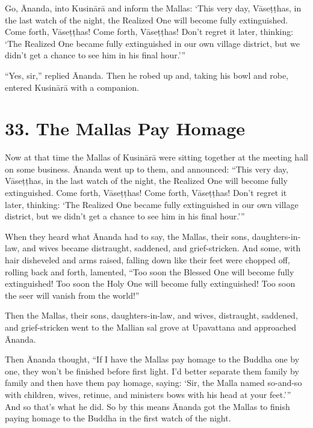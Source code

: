 \documentclass[12pt,openany]{book}%
\begin{document}
Go, Ānanda, into \textsanskrit{Kusinārā} and inform the Mallas: ‘This very day, \textsanskrit{Vāseṭṭhas}, in the last watch of the night, the Realized One will become fully extinguished. Come forth, \textsanskrit{Vāseṭṭhas}! Come forth, \textsanskrit{Vāseṭṭhas}! Don’t regret it later, thinking: ‘The Realized One became fully extinguished in our own village district, but we didn’t get a chance to see him in his final hour.’” 

“Yes, sir,” replied Ānanda. Then he robed up and, taking his bowl and robe, entered \textsanskrit{Kusinārā} with a companion. 

\section*{33. The Mallas Pay Homage }

Now at that time the Mallas of \textsanskrit{Kusinārā} were sitting together at the meeting hall on some business. Ānanda went up to them, and announced: “This very day, \textsanskrit{Vāseṭṭhas}, in the last watch of the night, the Realized One will become fully extinguished. Come forth, \textsanskrit{Vāseṭṭhas}! Come forth, \textsanskrit{Vāseṭṭhas}! Don’t regret it later, thinking: ‘The Realized One became fully extinguished in our own village district, but we didn’t get a chance to see him in his final hour.’” 

When they heard what Ānanda had to say, the Mallas, their sons, daughters-in-law, and wives became distraught, saddened, and grief-stricken. And some, with hair disheveled and arms raised, falling down like their feet were chopped off, rolling back and forth, lamented, “Too soon the Blessed One will become fully extinguished! Too soon the Holy One will become fully extinguished! Too soon the seer will vanish from the world!” 

Then the Mallas, their sons, daughters-in-law, and wives, distraught, saddened, and grief-stricken went to the Mallian sal grove at Upavattana and approached Ānanda. 

Then Ānanda thought, “If I have the Mallas pay homage to the Buddha one by one, they won’t be finished before first light. I’d better separate them family by family and then have them pay homage, saying: ‘Sir, the Malla named so-and-so with children, wives, retinue, and ministers bows with his head at your feet.’” And so that’s what he did. So by this means Ānanda got the Mallas to finish paying homage to the Buddha in the first watch of the night. 
\end{document}
